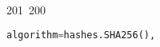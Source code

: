 201~200~\documentclass{article}
\begin{document}
\begin{lstlisting}[language=Python, caption=Shared Secret Computation and Encryption Key Derivation]
	                                                                                                                                                                                                                                                                                                	                                                                                                                                        	    	                                                                                                	                                                                                                                                                                                                                                                                                                                                	                                                                        	                                                                        	                                                                                                                                        	                                                                                                                                                                                                                        	        algorithm=hashes.SHA256(),
	                                                                                                                                                                                                                                                                                                	                                                                                                                                        	    	                                                                                                	                                                                                                                                                                                                                                                                                                                                	                                                                        	                                                                        	                                                                                                                                        	                                                                                                                                                                                                                        	                length=32,

\end{lstlisting}
\end{document}
